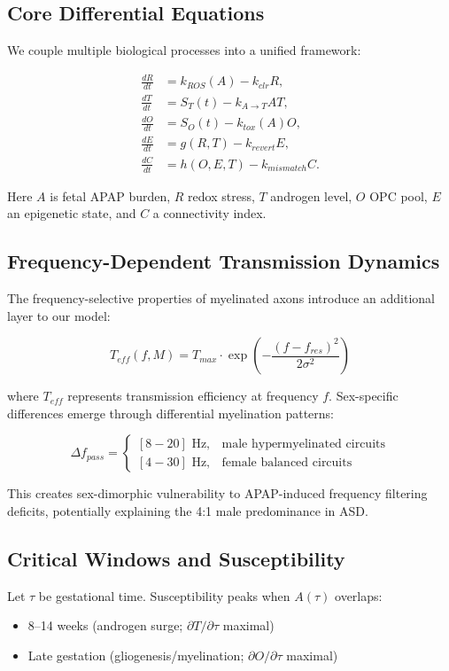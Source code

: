 \documentclass[12pt]{article}
\begin{document}
\subsection{Core Differential Equations}
We couple multiple biological processes into a unified framework:

\begin{align}
\frac{dR}{dt} &= k_{ROS}(A) - k_{clr}R, \\
\frac{dT}{dt} &= S_T(t) - k_{A \rightarrow T}AT, \\
\frac{dO}{dt} &= S_O(t) - k_{tox}(A)O, \\
\frac{dE}{dt} &= g(R,T) - k_{revert}E, \\
\frac{dC}{dt} &= h(O,E,T) - k_{mismatch}C.
\end{align}

Here $A$ is fetal APAP burden, $R$ redox stress, $T$ androgen level, $O$ OPC pool, $E$ an epigenetic state, and $C$ a connectivity index.

\subsection{Frequency-Dependent Transmission Dynamics}
The frequency-selective properties of myelinated axons introduce an additional layer to our model:

\begin{equation}
T_{eff}(f,M) = T_{max} \cdot \exp\left(-\frac{(f-f_{res})^2}{2\sigma^2}\right)
\end{equation}

where $T_{eff}$ represents transmission efficiency at frequency $f$. Sex-specific differences emerge through differential myelination patterns:

\begin{equation}
\Delta f_{pass} = \begin{cases}
[8-20] \text{ Hz}, & \text{male hypermyelinated circuits} \\
[4-30] \text{ Hz}, & \text{female balanced circuits}
\end{cases}
\end{equation}

This creates sex-dimorphic vulnerability to APAP-induced frequency filtering deficits, potentially explaining the 4:1 male predominance in ASD.

\subsection{Critical Windows and Susceptibility}
Let $\tau$ be gestational time. Susceptibility peaks when $A(\tau)$ overlaps:
\begin{itemize}
\item 8--14 weeks (androgen surge; $\partial T/\partial \tau$ maximal)
\item Late gestation (gliogenesis/myelination; $\partial O/\partial \tau$ maximal)
\end{itemize}
\end{document}
